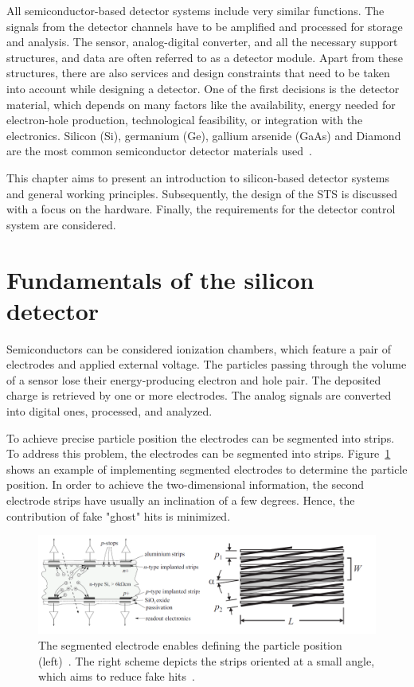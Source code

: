 
All semiconductor-based detector systems include very similar functions. The signals from the detector channels have to be amplified and processed for storage and analysis. The sensor, analog-digital converter, and all the necessary support structures, and data  are often referred to as a detector module. Apart from these structures, there are also services and design constraints that need to be taken into account while designing a detector. One of the first decisions is the detector material, which depends on many factors like the availability, energy needed for electron-hole production, technological feasibility, or integration with the electronics. Silicon (Si), germanium (Ge), gallium arsenide (GaAs) and Diamond are the most common semiconductor detector materials used~\cite{Lutz:1999wg,Hartmann:2017gzy}.


This chapter aims to present an introduction to silicon-based detector systems and general working principles. Subsequently, the design of the \gls{STS} is discussed with a focus on the hardware. Finally, the requirements for the detector control system are considered. 

\section{Fundamentals of the silicon detector}
Semiconductors can be considered ionization chambers, which feature a pair of electrodes and applied external voltage. The particles passing through the volume of a sensor lose their energy-producing electron and hole pair. The deposited charge is retrieved by one or more electrodes. The analog signals are converted into digital ones, processed, and analyzed.

To achieve precise particle position the electrodes can be segmented into strips. To address this problem, the electrodes can be segmented into strips. Figure~\ref{fig_si} shows an example of implementing segmented electrodes to determine the particle position. In order to achieve the two-dimensional information, the second electrode strips have usually an inclination of a few degrees. Hence, the contribution of fake "ghost" hits is minimized.  

\begin{figure}[!h]
\centering
\includegraphics[width=0.95\columnwidth]{Chapter2/images/silicons.png}
\caption{The segmented electrode enables defining the particle position (left)~\cite{Sokolov:2006vdx}. The right scheme depicts the strips oriented at a small angle, which aims to reduce fake hits~\cite{Spieler}.}
\label{fig_si}
\end{figure}
\newpage

